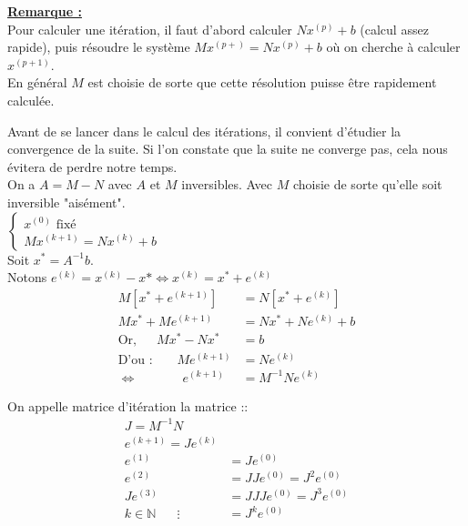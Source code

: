 \noindent \textbf{\underline{Remarque :}}\\
Pour calculer une itération, il faut d'abord calculer $Nx^{(p)} + b$ (calcul assez rapide), puis résoudre le système $Mx^{(p+)} = Nx^{(p)}+b$ où on cherche à calculer $x^{(p+1)}$.\\
En général $M$ est choisie de sorte que cette résolution puisse être rapidement calculée.

Avant de se lancer dans le calcul des itérations, il convient d'étudier la convergence de la suite. Si l'on constate que la suite ne converge pas, cela nous évitera de perdre notre temps. \\
On a $A = M-N$ avec $A$ et $M$ inversibles. Avec $M$ choisie de sorte qu'elle soit inversible "aisément".\\

$\begin{cases}
	x^{(0)} \text{ fixé}\\
	Mx^{(k+1)} = Nx^{(k)}+b
\end{cases}$\\


Soit $x^* = A^{-1}b$. \\
Notons $e^{(k)} = x^{(k)}-x* \Leftrightarrow x^{(k)} = x^*+e^{(k)}$\\
\begin{align*}
	M\left[x^* + e^{(k+1)}\right] &= N\left[x^* + e^{(k)}\right]\\
	Mx^*+Me^{(k+1)} &= Nx^* + Ne^{(k)} + b\\
	\text{Or, } \hspace{15pt} Mx^*-Nx^* &= b\\
	\text{D'ou : } \hspace{19pt} Me^{(k+1)} &= Ne^{(k)}\\
	\Leftrightarrow \hspace{42pt} e^{(k+1)} &= M^{-1}Ne^{(k)} 
\end{align*}



On appelle matrice d'itération la matrice ::
\begin{align*}
J = M^{-1}N\\
e^{(k+1)} = Je^{(k)}\\
e^{(1)} &= Je^{(0)}\\
e^{(2)} &= JJe^{(0)} = J^2e^{(0)}\\
Je^{(3)} &= JJJe^{(0)} = J^3e^{(0)}\\
k \in \mathbb{N} \hspace{20pt} \vdots \hspace{10pt} &= J^ke^{(0)} 
\end{align*}

